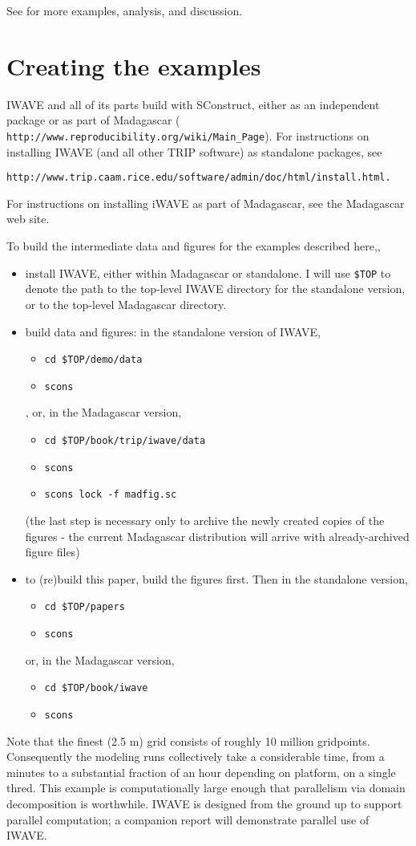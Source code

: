 See
\cite[]{SymesVdovina:09} for more examples, analysis, and discussion.

\section{Creating the examples}
IWAVE and all of its parts build with SConstruct, either as an
independent package or as part of Madagascar ({\tt
  http://www.reproducibility.org/wiki/Main\_Page}). For instructions on
installing IWAVE (and all other TRIP software) as standalone packages, see 
\begin{verbatim}
http://www.trip.caam.rice.edu/software/admin/doc/html/install.html.
\end{verbatim}
For instructions on installing iWAVE as part of Madagascar, see the
Madagascar web site.

To build the intermediate data and figures for  the examples described
here,,
\begin{itemize}
\item install IWAVE, either within Madagascar or standalone. I will use  {\tt \$TOP} to denote
  the path to the top-level IWAVE directory for the standalone
  version, or to the top-level Madagascar directory.
\item build data and figures: in the standalone version of IWAVE,
\begin{itemize}
  \item {\tt cd \$TOP/demo/data}
\item {\tt scons}
\end{itemize},
or, in the Madagascar version,
\begin{itemize}
\item {\tt cd \$TOP/book/trip/iwave/data}
\item {\tt scons}
\item {\tt scons lock -f madfig.sc}
\end{itemize}
(the last step is necessary only to archive the newly created copies
of the figures - the current Madagascar distribution will arrive with
already-archived figure files)
\item to (re)build this paper, build the figures first. Then in the standalone version,
\begin{itemize}
\item {\tt cd \$TOP/papers}
\item {\tt scons}
\end{itemize} 
or, in the Madagascar version,
\begin{itemize}
\item {\tt cd \$TOP/book/iwave}
\item {\tt scons}
\end{itemize}

\end{itemize}
Note that the finest (2.5 m) grid consists of roughly 10 million
gridpoints. Consequently the modeling runs collectively take a
considerable time, from a minutes to a substantial fraction of an hour
depending on platform,
on a single thred. This example is computationally large enough that
parallelism via domain decomposition is worthwhile. IWAVE is designed
from the ground up to support parallel computation; a companion report
will demonstrate parallel use of IWAVE.

